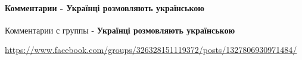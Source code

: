  
 
 
 
 
\paragraph{Комментарии - Українці розмовляють українською}

Комментарии с группы - {\bfseries Українці розмовляють українською}\par
\url{https://www.facebook.com/groups/326328151119372/posts/1327806930971484/}

